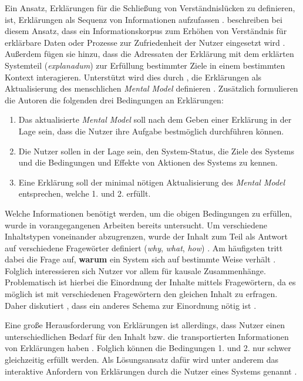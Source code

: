 Ein Ansatz, Erklärungen für die Schließung von Verständnislücken zu definieren, ist, Erklärungen als Sequenz von Informationen aufzufassen \cite[vgl.][]{wang_integration_2020}. \citeauthor{sovrano_modelling_2020} beschreiben bei diesem Ansatz, dass ein Informationskorpus zum Erhöhen von Verständnis für erklärbare Daten oder Prozesse zur Zufriedenheit der Nutzer eingesetzt wird \cite[übersetzt vgl.][]{sovrano_modelling_2020}. Außerdem fügen sie hinzu, dass die Adressaten der Erklärung mit dem erklärten Systemteil (\textit{explanadum}) zur Erfüllung bestimmter Ziele in einem bestimmten Kontext interagieren. Unterstützt wird dies durch \citeauthor{zahedi_towards_2019}, die Erklärungen als \glqq Aktualisierung des menschlichen \textit{Mental Model}\grqq{} definieren \cite[übersetzt vgl.][]{zahedi_towards_2019}. Zusätzlich formulieren die Autoren die folgenden drei Bedingungen an Erklärungen:
\begin{enumerate}
    \item Das aktualisierte \textit{Mental Model} soll nach dem Geben einer Erklärung in der Lage sein, dass die Nutzer ihre Aufgabe bestmöglich durchführen können.
    \item Die Nutzer sollen in der Lage sein, den System-Status, die Ziele des Systems und die Bedingungen und Effekte von Aktionen des Systems zu kennen.
    \item Eine Erklärung soll der minimal nötigen Aktualisierung des \textit{Mental Model} entsprechen, welche 1. und 2. erfüllt.
\end{enumerate}

Welche Informationen benötigt werden, um die obigen Bedingungen zu erfüllen, wurde in vorangegangenen Arbeiten bereits untersucht. Um verschiedene Inhaltstypen voneinander abzugrenzen, wurde der Inhalt zum Teil als Antwort auf verschiedene Fragewörter definiert (\textit{why}, \textit{what}, \textit{how}) \cite{rosenfeld_explainability_2019}. Am häufigsten tritt dabei die Frage auf, \textbf{warum} ein System sich auf bestimmte Weise verhält \cite{chazette2020explainability}. Folglich interessieren sich Nutzer vor allem für kausale Zusammenhänge. Problematisch ist hierbei die Einordnung der Inhalte mittels Fragewörtern, da es möglich ist mit verschiedenen Fragewörtern den gleichen Inhalt zu erfragen. Daher diskutiert \citeauthor{wang_integration_2020}, dass ein anderes Schema zur Einordnung nötig ist \cite{wang_integration_2020}.

Eine große Herausforderung von Erklärungen ist allerdings, dass Nutzer einen unterschiedlichen Bedarf für den Inhalt bzw. die transportierten Informationen von Erklärungen haben \cite{chazette2020explainability}. Folglich können die Bedingungen 1. und 2. nur schwer gleichzeitig erfüllt werden. Als Lösungsansatz dafür wird unter anderem das interaktive Anfordern von Erklärungen durch die Nutzer eines Systems genannt \cite{chazette_end-users_nodate}.

